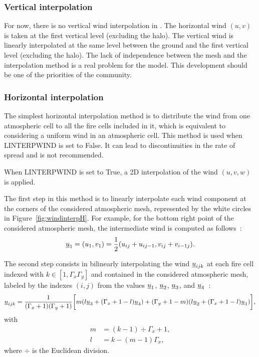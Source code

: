 \subsubsection{Vertical interpolation}

For now, there is no vertical wind interpolation in \Blaze.
The horizontal wind $(u, v)$ is taken at the first vertical level (excluding the halo).
The vertical wind is linearly interpolated at the same level between the ground and the first vertical level (excluding the halo).
The lack of independence between the mesh and the interpolation method is a real problem for the model.
This development should be one of the priorities of the community. 

\subsubsection{Horizontal interpolation}

The simplest horizontal interpolation method is to distribute the wind from one atmospheric cell to all the fire cells included in it, which is equivalent to considering a uniform wind in an atmospheric cell. This method is used when LINTERPWIND is set to False. It can lead to discontinuities in the rate of spread and is not recommended.

\medskip

When LINTERPWIND is set to True, a 2D interpolation of the wind $(u,v, w)$ is applied.

The first step in this method is to linearly interpolate each wind component at the corners of the considered atmospheric mesh, represented by the white circles in Figure~\ref{fig:windinterpH}. For example, for the bottom right point of the considered atmospheric mesh, the intermediate wind is computed as follows~:
\begin{equation}
\underline{u}_1 = (u_1,v_1) = \frac{1}{2} (u_{ij} + u_{ij-1},v_{ij} + v_{i-1j}).
\end{equation}

The second step consists in bilinearly interpolating the wind $\underline{u}_{ijk}$ at each fire cell indexed with $k \in [1,\Gamma_x \Gamma_y]$ and contained in the considered atmospheric mesh, labeled by the indexes $(i,j)$ from the values $\underline{u}_1$, $\underline{u}_2$, $\underline{u}_3$, and $\underline{u}_4$~:
\begin{equation}
	  \underline{u}_{ijk} = \frac{1}{(\Gamma_x +1 ) (\Gamma_y +1)}  \bigg [ m(l \underline{u}_3 + (\Gamma_x + 1 - l) \underline{u}_4) + (\Gamma_y + 1 - m)(l \underline{u}_2 + (\Gamma_x +1 - l) \underline{u}_1) \bigg ],
\end{equation}
with
\begin{align}
  m &= (k-1) \div \Gamma_x + 1,  \\
  l &= k - (m-1)\Gamma_x,
\end{align}
where $\div$ is the Euclidean division.

